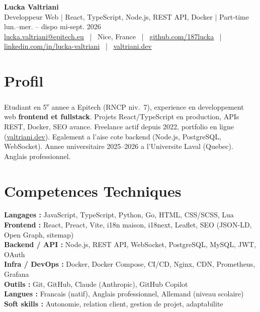 \documentclass[9pt,a4paper]{article}
\newcommand{\myphone}{}
\begin{document}
\begin{center}
  {\Large\bfseries\color{accent} Lucka Valtriani}\\[3pt]
  {\small\color{gray} Developpeur Web | React, TypeScript, Node.js, REST API, Docker | Part-time lun.--mer. -- dispo mi-sept. 2026}\\[5pt]
  {\footnotesize
    \myphone\href{mailto:lucka.valtriani@epitech.eu}{lucka.valtriani@epitech.eu}
    ~|~ Nice, France
    ~|~ \href{https://github.com/187lucka}{github.com/187lucka}
    ~|~ \href{https://www.linkedin.com/in/lucka-valtriani-8a8551258/}{linkedin.com/in/lucka-valtriani}
    ~|~ \href{https://valtriani.dev}{valtriani.dev}
  }
\end{center}

\vspace{3pt}

\section{Profil}
{\small Etudiant en 5\textsuperscript{e} annee a Epitech (RNCP niv.~7), experience en developpement web \textbf{frontend et fullstack}. Projets React/TypeScript en production, APIs REST, Docker, SEO avance. Freelance actif depuis 2022, portfolio en ligne (\href{https://valtriani.dev}{valtriani.dev}). Egalement a l'aise cote backend (Node.js, PostgreSQL, WebSocket). Annee universitaire 2025--2026 a l'Universite Laval (Quebec). Anglais professionnel.}

\section{Competences Techniques}
{\small
\noindent\textbf{Langages :} JavaScript, TypeScript, Python, Go, HTML, CSS/SCSS, Lua\\[2pt]
\noindent\textbf{Frontend :} React, Preact, Vite, i18n maison, i18next, Leaflet, SEO (JSON-LD, Open Graph, sitemap)\\[2pt]
\noindent\textbf{Backend / API :} Node.js, REST API, WebSocket, PostgreSQL, MySQL, JWT, OAuth\\[2pt]
\noindent\textbf{Infra / DevOps :} Docker, Docker Compose, CI/CD, Nginx, CDN, Prometheus, Grafana\\[2pt]
\noindent\textbf{Outils :} Git, GitHub, Claude (Anthropic), GitHub Copilot\\[2pt]
\noindent\textbf{Langues :} Francais (natif), Anglais professionnel, Allemand (niveau scolaire)\\[2pt]
\noindent\textbf{Soft skills :} Autonomie, relation client, gestion de projet, adaptabilite
}
\end{document}
